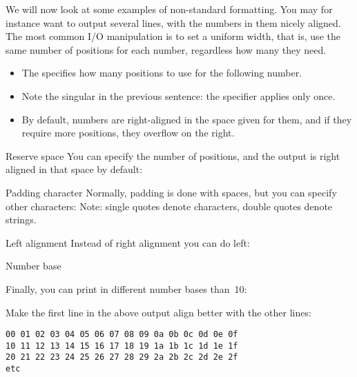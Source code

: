 We will now look at some examples of non-standard formatting.
You may for instance want to output several lines, with the numbers
in them nicely aligned.
The most common I/O manipulation is to set a uniform width,
that is, use the same number of positions for each number,
regardless how many they need.
\begin{itemize}
\item The  specifies how many positions to use
  for the following number.
\item Note the singular in the previous sentence: the 
  specifier applies only once.
\item By default, numbers are right-aligned in the space
  given for them, and if they require more positions,
  they overflow on the right.
\end{itemize}

\begin{block}{Reserve space}
  \label{sl:io-setw}
  You can specify the number of positions, and the output is right
  aligned in that space by default:
\end{block}

\begin{block}{Padding character}
  \label{sl:io-fill}
  Normally, padding is done with spaces, but you can specify other characters:
Note: single quotes denote characters, double quotes denote strings.
\end{block}

\begin{block}{Left alignment}
  \label{sl:io-left}
  Instead of right alignment you can do left:
\end{block}

\begin{block}{Number base}
  \label{sl:io-base}
  \advance\textwidth -2in 

  Finally, you can print in different number bases than~10:

  \def\snippetcodefraction{.4}
  \def\snippetanswfraction{.6}
  \def\codesize{\ttfamily\tiny}
  \def\verbsize{\ttfamily\tiny}

\end{block}

\begin{exercise}
  \label{ex:leadzero}
  Make the first line in the above output align better with the other lines:
\begin{verbatim}
00 01 02 03 04 05 06 07 08 09 0a 0b 0c 0d 0e 0f 
10 11 12 13 14 15 16 17 18 19 1a 1b 1c 1d 1e 1f 
20 21 22 23 24 25 26 27 28 29 2a 2b 2c 2d 2e 2f 
etc
\end{verbatim}
\end{exercise}

